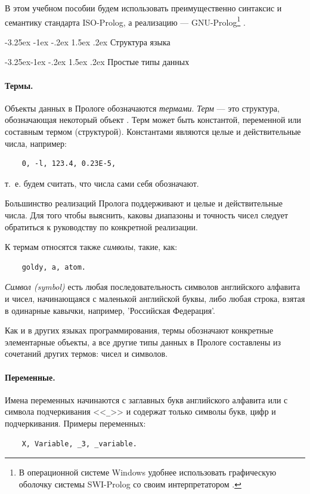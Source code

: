 \documentclass[12pt, openany, twoside]{book} %
\makeatletter
\renewcommand\section{\@startsection {section}{1}{\z@}%
                                   {-3.25ex \@plus -1ex \@minus -.2ex}%
                                   {1.5ex \@plus.2ex}%
                                   {\normalfont\large\bfseries}}
\renewcommand\subsection{\@startsection{subsection}{2}{\z@}%
                                     {-3.25ex\@plus -1ex \@minus -.2ex}%
                                     {1.5ex \@plus .2ex}%
                                     {\normalfont\normalsize\bfseries}}
\makeatother
\begin{document}
В этом учебном пособии будем использовать преимущественно синтаксис и семантику стандарта ISO-Prolog, а реализацию --- GNU-Prolog\footnote{В операционной системе Windows удобнее использовать графическую оболочку системы SWI-Prolog со своим интерпретатором \cite{SWIP}.} \cite{GNUP}.

\section{Структура языка}

\subsection{Простые типы данных}
\paragraph{Термы.}
Объекты данных в Прологе обозначаются \emph{термами}. {\em Терм} --- это структура, обозначающая некоторый объект  \cite{DDW}. Терм может быть константой, переменной или составным термом (структурой). Константами являются целые и действительные числа, например:
{\tt\begin{verbatim}
    0, -l, 123.4, 0.23E-5,
\end{verbatim}}
\noindent т.~е. будем считать, что числа сами себя обозначают.

Большинство реализаций Пролога поддерживают и целые и действительные числа. Для того чтобы выяснить, каковы диапазоны и точность чисел следует обратиться к руководству по конкретной реализации.

К термам относятся также \emph{символы}, такие, как:
{\tt\begin{verbatim}
    goldy, а, atom.
\end{verbatim}}

{\em Символ (symbol)} есть любая последовательность символов английского алфавита и чисел, начинающаяся с маленькой английской буквы, либо любая строка, взятая в одинарные кавычки, например, 'Российская Федерация'.

Как и в других языках программирования, термы обозначают конкретные элементарные объекты, а все другие типы данных в Прологе составлены из сочетаний других термов: чисел и символов.

\paragraph{Переменные.}
Имена переменных начинаются с заглавных букв английского алфавита или с символа подчеркивания <<{\tt \_}>> и содержат только символы букв, цифр и подчеркивания. Примеры переменных:
{\tt\begin{verbatim}
    X, Variable, _3, _variable.
\end{verbatim}}
\end{document}
